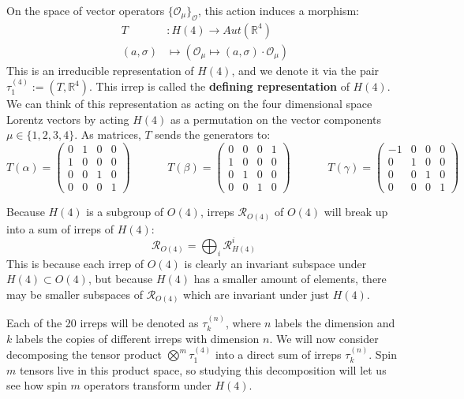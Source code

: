 \documentclass[11pt, oneside]{article}   	%
\theoremstyle{definition}
\begin{document}
On the space of vector operators $\{\mathcal O_\mu\}_\mathcal{O}$, this action induces a morphism:
\begin{align}
	T &: H(4)\rightarrow Aut(\mathbb R^4) \\
	(a, \sigma) &\mapsto \left(\mathcal O_{\mu}\mapsto (a, \sigma)\cdot \mathcal O_\mu\right)
\end{align}
This is an irreducible representation of $H(4)$, and we denote it via the pair $\tau_1^{(4)} := (T, \mathbb R^4)$. 
This irrep is called the \textbf{defining representation} of $H(4)$. We can think of this representation as acting 
on the four dimensional space Lorentz vectors by acting $H(4)$ as a permutation on the vector components 
$\mu \in\{1, 2, 3, 4\}$. As matrices, $T$ sends the generators to:
\begin{equation}
	T(\alpha) = \begin{pmatrix} 0 & 1 & 0 & 0 \\ 1 & 0 & 0 & 0 \\ 0 & 0 & 1 & 0 \\ 0 & 0 & 0 & 1 \end{pmatrix} 
	\;\;\;\;\;\;\;\;\;\;\;\;
	T(\beta) =  \begin{pmatrix} 0 & 0 & 0 & 1 \\ 1 & 0 & 0 & 0 \\ 0 & 1 & 0 & 0 \\ 0 & 0 & 1 & 0 \end{pmatrix}
	\;\;\;\;\;\;\;\;\;\;\;\;
	T(\gamma) = \begin{pmatrix} -1 & 0 & 0 & 0 \\ 0 & 1 & 0 & 0 \\ 0 & 0 & 1 & 0 \\ 0 & 0 & 0 & 1 \end{pmatrix}
\end{equation}

Because $H(4)$ is a subgroup of $O(4)$, irreps $\mathcal R_{O(4)}$ of $O(4)$ will break up into a sum of irreps of 
$H(4)$:
\begin{equation}
	\mathcal R_{O(4)} = \bigoplus_i \mathcal R_{H(4)}^i~
	\label{eq:o4_splitting}
\end{equation}
This is because each irrep of $O(4)$ is clearly an invariant subspace under $H(4)\subset O(4)$, but because $H(4)$ 
has a smaller amount of elements, there may be smaller subspaces of $\mathcal R_{O(4)}$ which are invariant under 
just $H(4)$. 

Each of the 20 irreps will be denoted as $\tau^{(n)}_k$, where $n$ labels the dimension and $k$ labels the copies of 
different irreps with dimension $n$. We will now consider decomposing the tensor product $\bigotimes^m \tau^{(4)}_1$ 
into a direct sum of irreps $\tau^{(n)}_k$. Spin $m$ tensors live in this product space, so studying this decomposition will 
let us see how spin $m$ operators transform under $H(4)$. 
\end{document}
